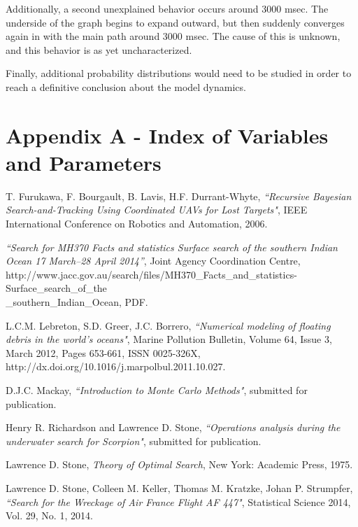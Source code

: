 \documentclass[a4paper]{article}
\begin{document}
Additionally, a second unexplained behavior occurs around 3000 msec. The underside of the graph begins to expand outward, but then suddenly converges again in with the main path around 3000 msec. The cause of this is unknown, and this behavior is as yet uncharacterized. 

Finally, additional probability distributions would need to be studied in order to reach a definitive conclusion about the model dynamics.

\pagebreak \section*{Appendix A - Index of Variables and Parameters}



\pagebreak \begin{thebibliography}{10}
 T. Furukawa, F. Bourgault, B. Lavis, H.F. Durrant-Whyte, \emph{``Recursive Bayesian Search-and-Tracking Using Coordinated UAVs for Lost Targets"}, IEEE International Conference on Robotics and Automation, 2006. 

 \emph{``Search for MH370 Facts and statistics Surface search of the southern Indian Ocean 17 March–28 April 2014''}, Joint Agency Coordination Centre, \\http://www.jacc.gov.au/search/files/MH370\_Facts\_and\_statistics-Surface\_search\_of\_the\\\_southern\_Indian\_Ocean, PDF.

 L.C.M. Lebreton, S.D. Greer, J.C. Borrero, \emph{``Numerical modeling of floating debris in the world’s oceans"}, Marine Pollution Bulletin, Volume 64, Issue 3, March 2012, Pages 653-661, ISSN 0025-326X, http://dx.doi.org/10.1016/j.marpolbul.2011.10.027.

 D.J.C. Mackay, \emph{``Introduction to Monte Carlo Methods"}, submitted for publication.

 Henry R. Richardson and Lawrence D. Stone, \emph{``Operations analysis during the underwater search for Scorpion"}, submitted for publication. 

 Lawrence D. Stone, \textit{Theory of Optimal Search}, New York: Academic Press, 1975.

 Lawrence D. Stone, Colleen M. Keller, Thomas M. Kratzke, Johan P. Strumpfer, \emph{``Search for the Wreckage of Air France Flight AF 447"}, Statistical Science 2014, Vol. 29, No. 1, 2014.
\end{thebibliography}
\end{document}
